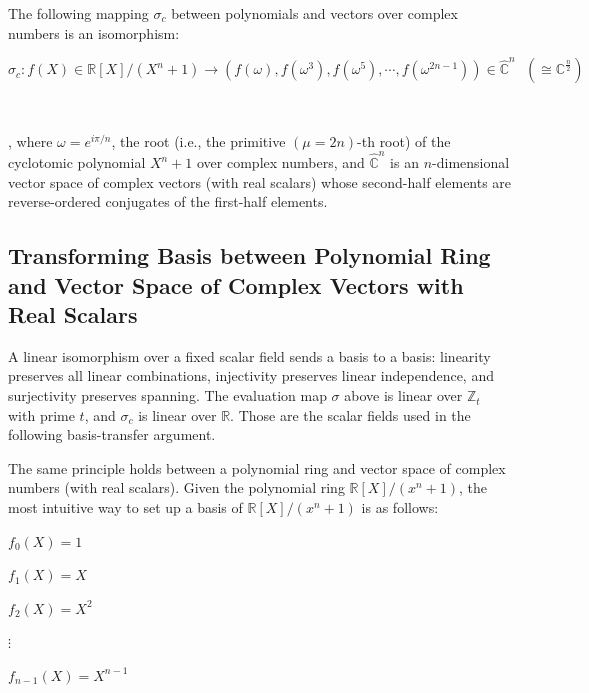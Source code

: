 \begin{tcolorbox}[title={\textbf{\tboxtheorem{\ref*{subsec:poly-vector-transformation-complex}} Isomorphism between Polynomials and Vectors over Complex Numbers}}]

The following mapping $\sigma_c$ between polynomials and vectors over complex numbers is an isomorphism:

$\sigma_c: f(X) \in \mathbb{R}[X]/(X^n + 1) \longrightarrow (f(\omega),f(\omega^3),f(\omega^5), \cdots, f(\omega^{2n-1})) \in \hat{\mathbb{C}}^{n} \text{ } (\cong \mathbb{C}^{\frac{n}{2}})$

$ $

, where $\omega = e^{i\pi/n}$, the root (i.e., the primitive $(\mu=2n)$-th root) of the cyclotomic polynomial $X^n + 1$ over complex numbers, and $\hat{\mathbb{C}}^{n}$ is an $n$-dimensional vector space of complex vectors (with real scalars) whose second-half elements are reverse-ordered conjugates of the first-half elements. 

\end{tcolorbox}





\subsection{Transforming Basis between Polynomial Ring and Vector Space of Complex Vectors with Real Scalars}
\label{subsec:poly-vector-basis-transfer}


A linear isomorphism over a fixed scalar field sends a basis to a basis: linearity preserves all linear combinations, injectivity preserves linear independence, and surjectivity preserves spanning. The evaluation map $\sigma$ above is linear over $\mathbb Z_t$ with prime $t$, and $\sigma_c$ is linear over $\mathbb R$. Those are the scalar fields used in the following basis-transfer argument.

The same principle holds between a polynomial ring and vector space of complex numbers (with real scalars). Given the polynomial ring $\mathbb{R}[X]/(x^n + 1)$, the most intuitive way to set up a basis of $\mathbb{R}[X]/(x^n + 1)$ is as follows:

$f_0(X) = 1$

$f_1(X) = X$

$f_2(X) = X^2$

$\vdots$

$f_{n-1}(X) = X^{n-1}$

$ $

